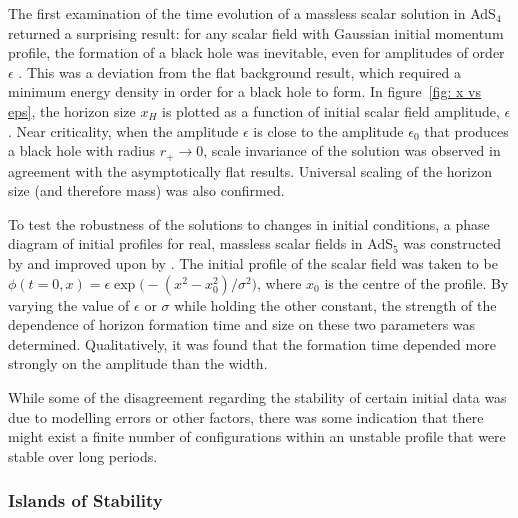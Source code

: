 \documentclass[../PhD.tex]{subfiles}
\begin{document}
The first examination of the time evolution of a massless scalar solution in AdS$_4$ returned a surprising result: for any scalar field with Gaussian initial momentum profile, the formation of a black hole was inevitable, even for amplitudes of order $\epsilon$ \cite{1104.3702}. This was a deviation from the flat background result, which required a minimum energy density in order for a black hole to form. In figure~\ref{fig: x vs eps}, the horizon size $x_H$ is plotted as a function of initial scalar field amplitude, $\epsilon$. Near criticality, when the amplitude $\epsilon$ is close to the amplitude $\epsilon_0$ that produces a black hole with radius $r_+ \to 0$, scale invariance of the solution was observed in agreement with the asymptotically flat results. Universal scaling of the horizon size (and therefore mass) was also confirmed. 

To test the robustness of the solutions to changes in initial conditions, a phase diagram of initial profiles for real, massless scalar fields in AdS$_5$ was constructed by \cite{1106.2339} and improved upon by \cite{1110.5823}. The initial profile of the scalar field was taken to be $\phi(t=0, x) = \epsilon \exp \big( -(x^2 - x_0^2) / \sigma^2 \big)$, where $x_0$ is the centre of the profile. By varying the value of $\epsilon$ or $\sigma$ while holding the other constant, the strength of the dependence of horizon formation time and size on these two parameters was determined. Qualitatively, it was found that the formation time depended more strongly on the amplitude than the width. 

While some of the disagreement regarding the stability of certain initial data was due to modelling errors or other factors, there was some indication that there might exist a finite number of configurations within an unstable profile that were stable over long periods. 

\subsubsection{Islands of Stability}
\label{ssub: islands}
 
\end{document}
